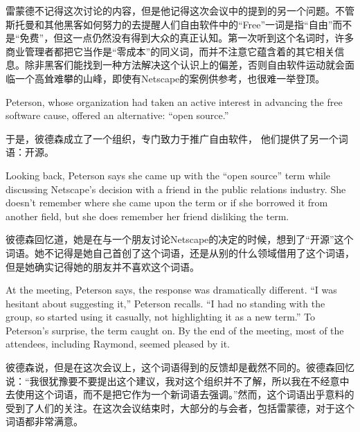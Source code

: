 \ifdefined\chs
雷蒙德不记得这次讨论的内容，但是他记得这次会议中的提到的另一个问题。不管斯托曼和其他黑客如何努力的去提醒人们自由软件中的``Free''一词是指``自由''而不是``免费''，但这一点仍然没有得到大众的真正认知。第一次听到这个名词时，许多商业管理者都把它当作是``零成本''的同义词，而并不注意它蕴含着的其它相关信息。除非黑客们能找到一种方法解决这个认识上的偏差，否则自由软件运动就会面临一个高耸难攀的山峰，即使有Netscape的案例供参考，也很难一举登顶。
\fi

\ifdefined\eng
Peterson, whose organization had taken an active interest in advancing the free software cause, offered an alternative: ``open source.''
\fi

\ifdefined\chs
于是，彼德森成立了一个组织，专门致力于推广自由软件， 他们提供了另一个词语：开源。
\fi

\ifdefined\eng
Looking back, Peterson says she came up with the ``open source'' term while discussing Netscape's decision with a friend in the public relations industry. She doesn't remember where she came upon the term or if she borrowed it from another field, but she does remember her friend disliking the term.
\fi

\ifdefined\chs
彼德森回忆道，她是在与一个朋友讨论Netscape的决定的时候，想到了``开源''这个词语。她不记得是她自己首创了这个词语，还是从别的什么领域借用了这个词语，但是她确实记得她的朋友并不喜欢这个词语。
\fi

\ifdefined\eng
At the meeting, Peterson says, the response was dramatically different. ``I was hesitant about suggesting it,'' Peterson recalls. ``I had no standing with the group, so started using it casually, not highlighting it as a new term.'' To Peterson's surprise, the term caught on. By the end of the meeting, most of the attendees, including Raymond, seemed pleased by it.
\fi

\ifdefined\chs
彼德森说，但是在这次会议上，这个词语得到的反馈却是截然不同的。彼德森回忆说：``我很犹豫要不要提出这个建议，我对这个组织并不了解，所以我在不经意中去使用这个词语，而不是把它作为一个新词语去强调。''然而，这个词语出乎意料的受到了人们的关注。在这次会议结束时，大部分的与会者，包括雷蒙德，对于这个词语都非常满意。
\fi

